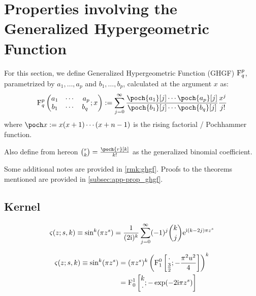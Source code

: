 \section{Properties involving the Generalized Hypergeometric Function}
For this section, we define Generalized Hypergeometric Function (GHGF) $\operatorname{F}_q^p$, parametrized by $a_1, \dots, a_p$ and $b_1, \dots, b_p$, calculated at the argument $x$ as: 
\[\Fhyp_q^p \left(\begin{matrix} a_1 & \cdots & a_p \\ b_1 & \cdots & b_q\ \end{matrix} ; x \right) := \sum_{j=0}^\infty \frac{\poch{a_1}[j] \cdots \poch{a_p}[j]}{\poch{b_1}[j] \cdots \poch{b_q}[j]} \frac{x^j}{j!}\]
where $\poch x := x(x+1)\cdots(x+n-1)$ is the rising factorial / Pochhammer function.

Also define from hereon ${r \choose k} = \frac{\poch{r}[k]}{k!}$ as the generalized binomial coefficient.

Some additional notes are provided in \autoref{rmk:ghgf}. Proofs to the theorems mentioned are provided in \autoref{subsec:app-prop_ghgf}.

\subsection{Kernel}
\begin{thm}\label{thm:kernelbin}
	\begin{equation}\label{eq:kernelbin}
		\varsigma(z; s,k) \equiv \sin^k (\pi z^s) =  \frac{1}{(2\mathrm i)^k} \sum_{j=0}^\infty (-1)^j {k \choose j}  \mathrm e^{\mathrm i (k-2j) \pi z^s}
	\end{equation}
\end{thm}

\begin{thm}\label{thm:kernelhgf}
	\begin{align}
		\varsigma(z; s,k) \equiv \sin^k (\pi z^s) &=  (\pi z^s)^k \left( \operatorname{F}^0_1 \left[ \begin{matrix} \cdot \\ \frac{3}{2} \end{matrix}; -\frac{\pi^2 u^2}{4}\right] \right)^k \label{eq:kernelghfreal}\\
		&= \operatorname{F}^1_0 \left[ \begin{matrix}k\\ \cdot\end{matrix};  -\exp(-2 \mathrm i \pi z^s) \right] \label{eq:kernelhgfcomplex}
	\end{align}
\end{thm}

